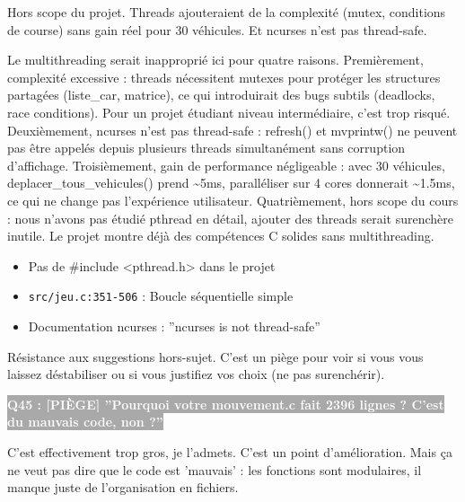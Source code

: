 \documentclass[12pt,a4paper]{article}
\newcommand{\question}[1]{%
    \vspace{0.5cm}
    \noindent\colorbox{darkgray}{\textcolor{white}{\textbf{#1}}}
    \vspace{0.3cm}
}
\begin{document}
\begin{reponse_courte}
Hors scope du projet. Threads ajouteraient de la complexité (mutex, conditions de course) sans gain réel pour 30 véhicules. Et ncurses n'est pas thread-safe.
\end{reponse_courte}

\begin{reponse_longue}
Le multithreading serait inapproprié ici pour quatre raisons. Premièrement, complexité excessive : threads nécessitent mutexes pour protéger les structures partagées (liste\_car, matrice), ce qui introduirait des bugs subtils (deadlocks, race conditions). Pour un projet étudiant niveau intermédiaire, c'est trop risqué. Deuxièmement, ncurses n'est pas thread-safe : refresh() et mvprintw() ne peuvent pas être appelés depuis plusieurs threads simultanément sans corruption d'affichage. Troisièmement, gain de performance négligeable : avec 30 véhicules, deplacer\_tous\_vehicules() prend \textasciitilde{}5ms, paralléliser sur 4 cores donnerait \textasciitilde{}1.5ms, ce qui ne change pas l'expérience utilisateur. Quatrièmement, hors scope du cours : nous n'avons pas étudié pthread en détail, ajouter des threads serait surenchère inutile. Le projet montre déjà des compétences C solides sans multithreading.
\end{reponse_longue}

\begin{reference_code}
\begin{itemize}
    \item Pas de \#include <pthread.h> dans le projet
    \item \texttt{src/jeu.c:351-506} : Boucle séquentielle simple
    \item Documentation ncurses : ''ncurses is not thread-safe''
\end{itemize}
\end{reference_code}

\begin{objectif_prof}
Résistance aux suggestions hors-sujet. C'est un piège pour voir si vous vous laissez déstabiliser ou si vous justifiez vos choix (ne pas surenchérir).
\end{objectif_prof}

\question{Q45 : [PIÈGE] ''Pourquoi votre mouvement.c fait 2396 lignes ? C'est du mauvais code, non ?''}

\begin{reponse_courte}
C'est effectivement trop gros, je l'admets. C'est un point d'amélioration. Mais ça ne veut pas dire que le code est 'mauvais' : les fonctions sont modulaires, il manque juste de l'organisation en fichiers.
\end{reponse_courte}
\end{document}
